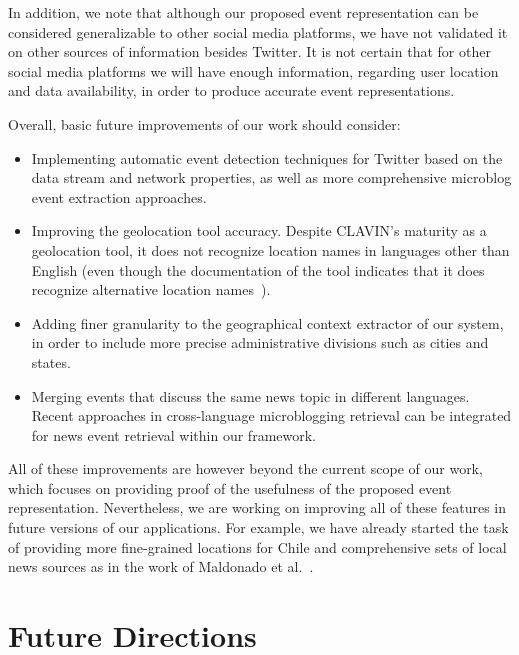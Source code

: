 In addition, we note that although our proposed event representation can be
considered generalizable to other social media platforms, we have not validated
it on other sources of information besides Twitter. 
%
It is not certain that for other social media platforms we will have enough
information, regarding user location and data availability, in order to produce
accurate event representations.

Overall, basic future improvements of our work should consider:
%
\begin{itemize}
\item Implementing automatic event detection techniques for Twitter based on the
data stream and network properties, as well as more comprehensive microblog
event extraction approaches.

\item Improving the geolocation tool accuracy. Despite CLAVIN's maturity as a
geolocation tool, it does not recognize location names in languages other than
English (even though the documentation of the tool indicates that it does
recognize alternative location names~\cite{clavin}).

\item Adding finer granularity to the geographical context extractor of our
system, in order to include more precise administrative divisions such as cities
and states.

\item Merging events that discuss the same news topic in different languages.
Recent approaches in cross-language microblogging retrieval
\cite{Godavarthy2016} can be integrated for news event retrieval within our
framework.
\end{itemize}

All of these improvements are however beyond the current scope of our work,
which focuses on providing proof of the usefulness of the proposed event
representation. 
%
Nevertheless, we are working on improving all of these features in future
versions of our applications.  
%
For example, we have already started the task of providing more fine-grained
locations for Chile and comprehensive sets of local news sources as in the work
of Maldonado et al.~\cite{maldonado2015spatio}.

\section{Future Directions}



